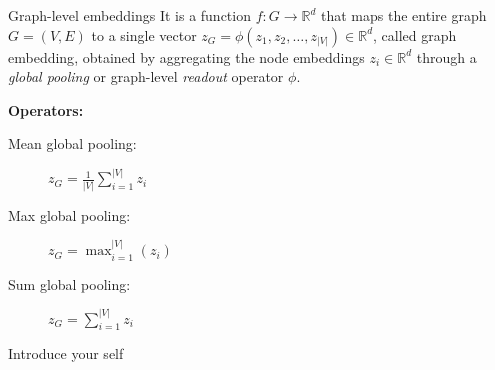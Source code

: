\documentclass[aspectratio=169]{beamer}
\renewcommand{\alert}[1]{\textbf{\color{swufe}#1}}
\newcommand{\alertplain}[1]{{\color{swufe}#1}}
\begin{document}
        \begin{frame}{Graph-level embeddings}
            It is a function $f: G \rightarrow \mathbb{R}^{d}$ that maps the entire graph $G = (V, E)$ to a single vector $z_G = \phi(z_1, z_2, \ldots, z_{|V|}) \in \mathbb{R}^{d}$, called \alertplain{graph embedding}, obtained by aggregating the node embeddings $z_i \in \mathbb{R}^{d}$ through a \textit{global pooling} or graph-level \textit{readout} operator $\phi$. \newline

            \alert{Operators:}
            \begin{description}
                \item [Mean global pooling:] $z_G = \frac{1}{|V|} \sum_{i=1}^{|V|}z_{i}$
                \item [Max global pooling:] $z_G = \max_{i=1}^{|V|}(z_{i})$
                \item [Sum global pooling:] $z_G = \sum_{i=1}^{|V|}z_{i}$
            \end{description}

            \begin{note}
                {Introduce your self}
            \end{note}
        \end{frame}
\end{document}

